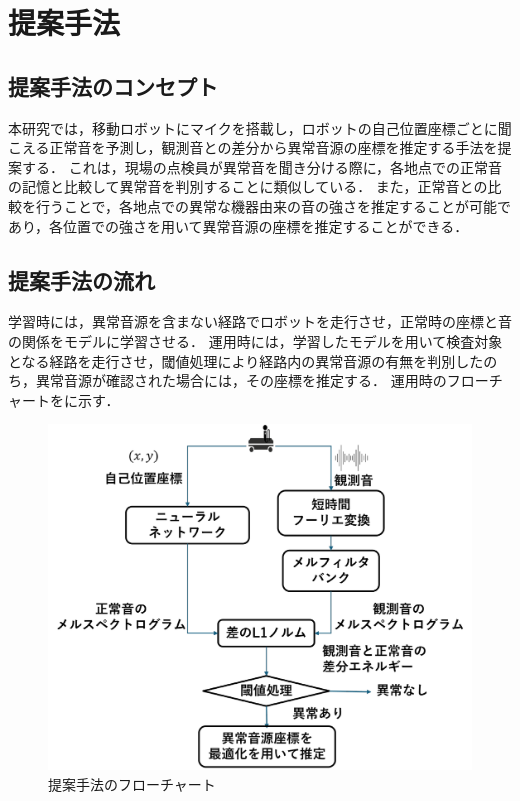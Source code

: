\documentclass[../main]{subfiles}
\begin{document}
\graphicspath{{../figures/}}

\section{提案手法}


\subsection{提案手法のコンセプト}
本研究では，移動ロボットにマイクを搭載し，ロボットの自己位置座標ごとに聞こえる正常音を予測し，観測音との差分から異常音源の座標を推定する手法を提案する．
これは，現場の点検員が異常音を聞き分ける際に，各地点での正常音の記憶と比較して異常音を判別することに類似している．
また，正常音との比較を行うことで，各地点での異常な機器由来の音の強さを推定することが可能であり，各位置での強さを用いて異常音源の座標を推定することができる．

\subsection{提案手法の流れ}
学習時には，異常音源を含まない経路でロボットを走行させ，正常時の座標と音の関係をモデルに学習させる．
運用時には，学習したモデルを用いて検査対象となる経路を走行させ，閾値処理により経路内の異常音源の有無を判別したのち，異常音源が確認された場合には，その座標を推定する．
運用時のフローチャートをに示す．
\begin{figure}[tb]
  \centering
  \includegraphics[keepaspectratio, width=1.0\linewidth]{flowchart.pdf}
  \caption{提案手法のフローチャート}
\end{figure}
\end{document}

